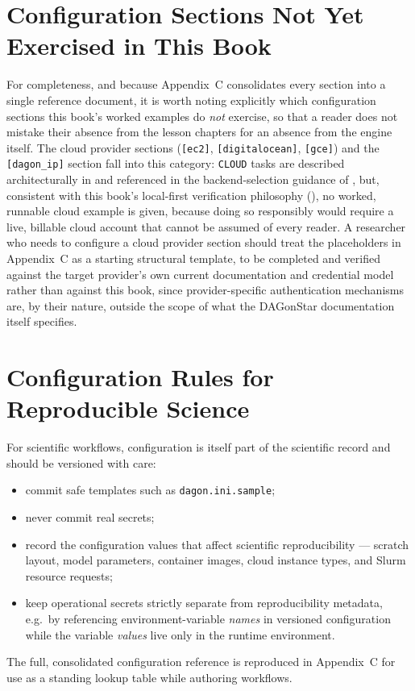 \section{Configuration Sections Not Yet Exercised in This Book}

For completeness, and because Appendix~C consolidates every section into a
single reference document, it is worth noting explicitly which
configuration sections this book's worked examples do \emph{not} exercise,
so that a reader does not mistake their absence from the lesson chapters for
an absence from the engine itself. The cloud provider sections
(\texttt{[ec2]}, \texttt{[digitalocean]}, \texttt{[gce]}) and the
\texttt{[dagon\_ip]} section fall into this category: \texttt{CLOUD} tasks
are described architecturally in  and referenced in
the backend-selection guidance of , but, consistent with
this book's local-first verification philosophy
(), no worked, runnable cloud example is given,
because doing so responsibly would require a live, billable cloud account
that cannot be assumed of every reader. A researcher who needs to configure
a cloud provider section should treat the placeholders in Appendix~C as a
starting structural template, to be completed and verified against the
target provider's own current documentation and credential model rather
than against this book, since provider-specific authentication mechanisms
are, by their nature, outside the scope of what the DAGonStar documentation
itself specifies.

\section{Configuration Rules for Reproducible Science}

\begin{practicebox}
For scientific workflows, configuration is itself part of the scientific
record and should be versioned with care:
\begin{itemize}[leftmargin=1.4em]
  \item commit safe templates such as \texttt{dagon.ini.sample};
  \item never commit real secrets;
  \item record the configuration values that affect scientific
    reproducibility --- scratch layout, model parameters, container images,
    cloud instance types, and Slurm resource requests;
  \item keep operational secrets strictly separate from reproducibility
    metadata, e.g.\ by referencing environment-variable \emph{names} in
    versioned configuration while the variable \emph{values} live only in
    the runtime environment.
\end{itemize}
\end{practicebox}

The full, consolidated configuration reference is reproduced in Appendix~C
for use as a standing lookup table while authoring workflows.
